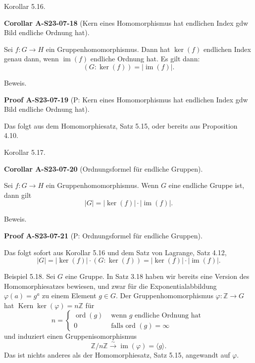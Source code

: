 \documentclass[10pt, letterpaper]{article}
\newcommand{\CustomHeading}[3]{%
  \par\medskip\noindent%
  \textbf{#1 #2} \textnormal{(#3)}.\enskip%
}
\newenvironment{KORO}[2]{\begin{unitbox}\CustomHeading{Corollar}{#1}{#2}}{\end{unitbox}}
\newenvironment{PROOF}[2]{\begin{unitbox}\CustomHeading{Proof}{#1}{#2}}{\end{unitbox}}
\begin{document}
Korollar 5.16. 

\begin{KORO}{A-S23-07-18}{Kern eines Homomorphismus hat endlichen Index gdw Bild endliche Ordnung hat}
Sei $f: G \rightarrow H$ ein Gruppenhomomorphismus. Dann hat $\operatorname{ker}(f)$ endlichen Index genau dann, wenn $\operatorname{im}(f)$ endliche Ordnung hat. Es gilt dann:
$$
(G: \operatorname{ker}(f))=|\operatorname{im}(f)| .
$$
\end{KORO}

Beweis. 

\begin{PROOF}{A-S23-07-19}{P: Kern eines Homomorphismus hat endlichen Index gdw Bild endliche Ordnung hat}
Das folgt aus dem Homomorphiesatz, Satz 5.15, oder bereits aus Proposition 4.10.
\end{PROOF}


Korollar 5.17. 

\begin{KORO}{A-S23-07-20}{Ordnungsformel für endliche Gruppen}
Sei $f: G \rightarrow H$ ein Gruppenhomomorphismus. Wenn $G$ eine endliche Gruppe ist, dann gilt
$$
|G|=|\operatorname{ker}(f)| \cdot|\operatorname{im}(f)| .
$$
\end{KORO}

Beweis. 

\begin{PROOF}{A-S23-07-21}{P: Ordnungsformel für endliche Gruppen}
Das folgt sofort aus Korollar 5.16 und dem Satz von Lagrange, Satz 4.12,
$$
|G|=|\operatorname{ker}(f)| \cdot(G: \operatorname{ker}(f))=|\operatorname{ker}(f)| \cdot|\operatorname{im}(f)| .
$$
\end{PROOF}


Beispiel 5.18. Sei $G$ eine Gruppe. In Satz 3.18 haben wir bereits eine Version des Homomorphiesatzes bewiesen, und zwar für die Exponentialabbildung $\varphi(a)=g^{a}$ zu einem Element $g \in G$. Der Gruppenhomomorphismus $\varphi: \mathbb{Z} \rightarrow G$ hat $\operatorname{Kern} \operatorname{ker}(\varphi)=n \mathbb{Z}$ für
$$
n= \begin{cases}\operatorname{ord}(g) & \text { wenn } g \text { endliche Ordnung hat } \\ 0 & \text { falls ord }(g)=\infty\end{cases}
$$
und induziert einen Gruppenisomorphismus
$$
\mathbb{Z} / n \mathbb{Z} \xrightarrow{\sim} \operatorname{im}(\varphi)=\langle g\rangle .
$$
Das ist nichts anderes als der Homomorphiesatz, Satz 5.15, angewandt auf $\varphi$.
\end{document}
